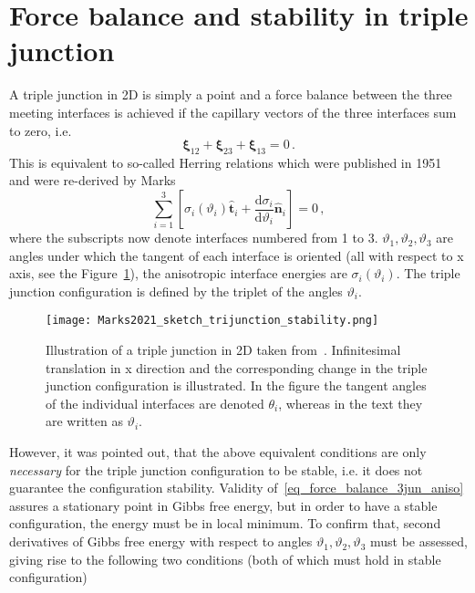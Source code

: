 \section{Force balance and stability in triple junction} \label{sec_intro_trijun_forcebalance_stability}
A triple junction in 2D is simply a point and a force balance between the three meeting interfaces is achieved if the capillary vectors of the three interfaces sum to zero, i.e.~\cite{Hoffman1972}
\begin{equation} \label{eq_trijun_forcebalance_sum_xivec}
    \bm{\xi}_{12}+\bm{\xi}_{23}+\bm{\xi}_{13}=0 \,.
\end{equation}
This is equivalent to so-called Herring relations which were published in 1951~\cite{Herring1999} and were re-derived by Marks~\cite{Marks2012}
\begin{equation} \label{eq_force_balance_3jun_aniso}
	\sum_{i=1}^3 \left[ \sigma_i(\vartheta_i)\hat{\bm{t}}_i +\frac{\mathrm{d} \sigma_i}{\mathrm{d} \vartheta_i}\hat{\bm{n}}_i \right] = 0 \,,
\end{equation}
where the subscripts now denote interfaces numbered from 1 to 3. $\vartheta_1,\vartheta_2,\vartheta_3$ are angles under which the tangent of each interface is oriented (all with respect to x axis, see the Figure~\ref{fig_Marks2012_sketch_trijun}), the anisotropic interface energies are $\sigma_i(\vartheta_i)$. The triple junction configuration is defined by the triplet of the angles $\vartheta_i$.
\begin{figure}
	\centering
	\texttt{[image: Marks2021\_sketch\_trijunction\_stability.png]}
	\caption[Illustration of a triple junction in 2D]{Illustration of a triple junction in 2D taken from~\cite{Marks2012}. Infinitesimal translation in x direction and the corresponding change in the triple junction configuration is illustrated. In the figure the tangent angles of  the individual interfaces are denoted $\theta_i$, whereas in the text they are written as $\vartheta_i$.}
	\label{fig_Marks2012_sketch_trijun}
\end{figure}
However, it was pointed out, that the above equivalent conditions are only \textit{necessary} for the triple junction configuration to be stable, i.e. it does not guarantee the configuration stability. Validity of~\eqref{eq_force_balance_3jun_aniso} assures a stationary point in Gibbs free energy, but in order to have a stable configuration, the energy must be in local minimum. To confirm that, second derivatives of Gibbs free energy with respect to angles $\vartheta_1,\vartheta_2,\vartheta_3$ must be assessed, giving rise to the following two conditions (both of which must hold in stable configuration)
